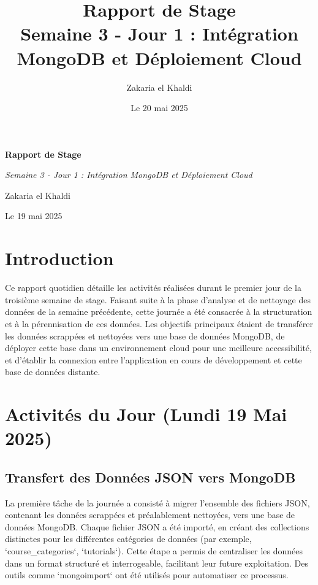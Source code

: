 \documentclass[12pt, a4paper]{article}
\title{\Huge\bfseries\color{primary} Rapport de Stage \\ 
      \Large Semaine 3 - Jour 1 : Intégration MongoDB et Déploiement Cloud} %
\author{\Large Zakaria el Khaldi}
\date{\large Le 20 mai 2025} %
\begin{document}
\begin{titlepage}
  \centering
  {\Huge\bfseries\color{primary} Rapport de Stage \par}
  \vspace{1cm}
  {\Large\itshape Semaine 3 - Jour 1 : Intégration MongoDB et Déploiement Cloud\par} %
  \vspace{2cm}
  
  \vspace{2cm}
  {\Large Zakaria el Khaldi\par}
  \vfill
  {\large Le 19 mai 2025\par} %
\end{titlepage}

\tableofcontents
\thispagestyle{empty}
\newpage

\section{Introduction}
\thispagestyle{fancy}
Ce rapport quotidien détaille les activités réalisées durant le premier jour de la troisième semaine de stage. Faisant suite à la phase d'analyse et de nettoyage des données de la semaine précédente, cette journée a été consacrée à la structuration et à la pérennisation de ces données. Les objectifs principaux étaient de transférer les données scrappées et nettoyées vers une base de données MongoDB, de déployer cette base dans un environnement cloud pour une meilleure accessibilité, et d'établir la connexion entre l'application en cours de développement et cette base de données distante.

\section{Activités du Jour (Lundi 19 Mai 2025)}

\subsection{Transfert des Données JSON vers MongoDB}
La première tâche de la journée a consisté à migrer l'ensemble des fichiers JSON, contenant les données scrappées et préalablement nettoyées, vers une base de données MongoDB. Chaque fichier JSON a été importé, en créant des collections distinctes pour les différentes catégories de données (par exemple, `course_categories`, `tutorials`). Cette étape a permis de centraliser les données dans un format structuré et interrogeable, facilitant leur future exploitation. Des outils comme `mongoimport` ont été utilisés pour automatiser ce processus.
\end{document}
